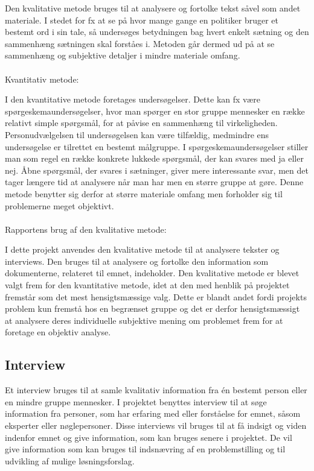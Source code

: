 \documentclass[11pt, twoside, a4paper, openright]{report}
\begin{document}
Den kvalitative metode bruges til at analysere og fortolke tekst såvel som andet materiale. I stedet for fx at se på hvor mange gange en politiker bruger et bestemt ord i sin tale, så undersøges betydningen bag hvert enkelt sætning og den sammenhæng sætningen skal forståes i. Metoden går dermed ud på at se sammenhæng og subjektive detaljer i mindre materiale omfang.
\\\\
	Kvantitativ metode:

I den kvantitative metode foretages undersøgelser. Dette kan fx være spørgeskemaundersøgelser, hvor man spørger en stor gruppe mennesker en række relativt simple spørgsmål, for at påvise en sammenhæng til virkeligheden. Personudvælgelsen til undersøgelsen kan være tilfældig, medmindre ens undersøgelse er tilrettet en bestemt målgruppe. I spørgeskemaundersøgelser stiller man som regel en række konkrete lukkede spørgsmål, der kan svares med ja eller nej. Åbne spørgsmål, der svares i sætninger, giver mere interessante svar, men det tager længere tid at analysere når man har men en større gruppe at gøre. Denne metode benytter sig derfor at større materiale omfang men forholder sig til problemerne meget objektivt.
\\\\
	Rapportens brug af den kvalitative metode:

I dette projekt anvendes den kvalitative metode til at analysere tekster og  interviews. Den bruges til at analysere og fortolke den information som dokumenterne, relateret til emnet, indeholder. Den kvalitative metode er blevet valgt frem for den kvantitative metode, idet at den med henblik på projektet fremstår som det mest hensigtsmæssige valg. Dette er blandt andet fordi projekts problem kun fremstå hos en begrænset gruppe og det er derfor hensigtsmæssigt at analysere deres individuelle subjektive mening om problemet frem for at foretage en objektiv analyse.

		\subsection{Interview}
	Et interview bruges til at samle kvalitativ information fra én bestemt person eller en mindre gruppe mennesker. I projektet benyttes interview til at søge information fra personer, som har erfaring med eller forståelse for emnet, såsom eksperter eller nøglepersoner. Disse interviews vil bruges til at få indsigt og viden indenfor emnet og give information, som kan bruges senere i projektet. De vil give information som kan bruges til indsnævring af en problemstilling og til udvikling af mulige løsningsforslag.
	
\end{document}
